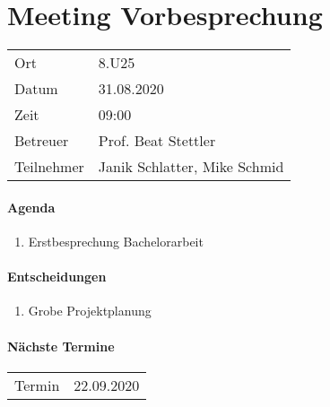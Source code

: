 \section*{Meeting Vorbesprechung}

\begin{table}[h!]
	\begin{tabularx}{\textwidth}{l X }
		Ort & 8.U25 \\
		Datum & 31.08.2020 \\
		Zeit & 09:00 \\
		Betreuer & Prof. Beat Stettler\\
		Teilnehmer & Janik Schlatter, Mike Schmid \\
	\end{tabularx}
\end{table}

\paragraph{Agenda}
\begin{enumerate}
	\item Erstbesprechung Bachelorarbeit
\end{enumerate}

\paragraph{Entscheidungen}
\begin{enumerate}
	\item Grobe Projektplanung
\end{enumerate}

\paragraph{Nächste Termine} \hfill
\begin{table}[h!]
	\begin{tabularx}{\textwidth}{l X }
		Termin & 22.09.2020 \\
	\end{tabularx}
\end{table}

\clearpage